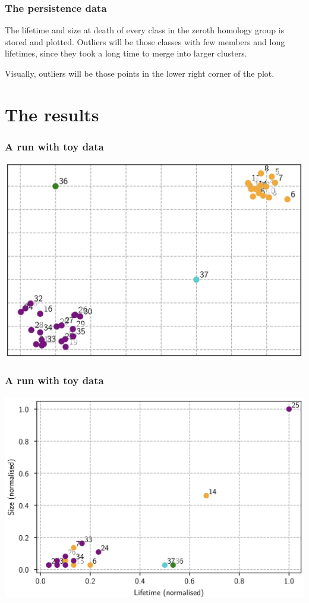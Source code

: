 \documentclass[xcolor=dvipsnames]{beamer}
\begin{document}
\begin{frame}
	\frametitle{The persistence data}
	The lifetime and size at death of every class in the zeroth homology group is stored and
	plotted. Outliers will be those classes with few members and long lifetimes, since they
	took a long time to merge into larger clusters. 

	\pause

	Visually, outliers will be those points in the lower right corner of the plot. 
\end{frame}

\section{The results}
\begin{frame}
	\frametitle{A run with toy data}
	\centering
	\includegraphics[width=\textwidth]{beamer/clusters}
\end{frame}

\begin{frame}
	\frametitle{A run with toy data}
	\centering
	\includegraphics[width=\textwidth]{beamer/toy-results}
\end{frame}
\end{document}

